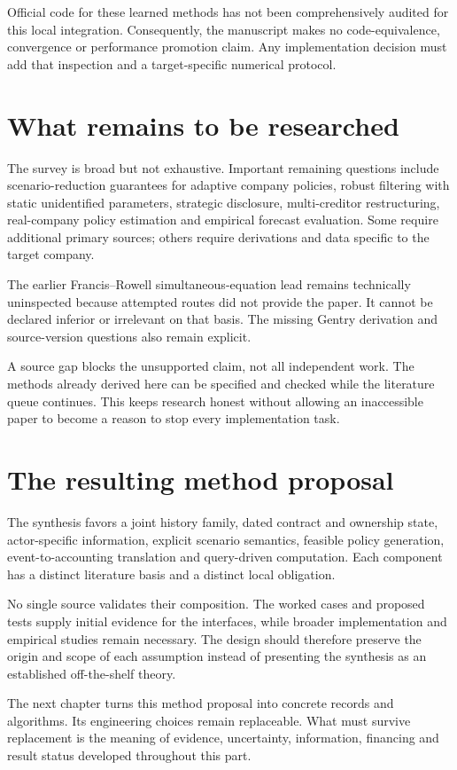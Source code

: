 Official code for these learned methods has not been comprehensively audited for this local integration. Consequently, the manuscript makes no code-equivalence, convergence or performance promotion claim. Any implementation decision must add that inspection and a target-specific numerical protocol.

\section{What remains to be researched}
The survey is broad but not exhaustive. Important remaining questions include scenario-reduction guarantees for adaptive company policies, robust filtering with static unidentified parameters, strategic disclosure, multi-creditor restructuring, real-company policy estimation and empirical forecast evaluation. Some require additional primary sources; others require derivations and data specific to the target company.

The earlier Francis--Rowell simultaneous-equation lead remains technically uninspected because attempted routes did not provide the paper. It cannot be declared inferior or irrelevant on that basis. The missing Gentry derivation and source-version questions also remain explicit.

A source gap blocks the unsupported claim, not all independent work. The methods already derived here can be specified and checked while the literature queue continues. This keeps research honest without allowing an inaccessible paper to become a reason to stop every implementation task.

\section{The resulting method proposal}
The synthesis favors a joint history family, dated contract and ownership state, actor-specific information, explicit scenario semantics, feasible policy generation, event-to-accounting translation and query-driven computation. Each component has a distinct literature basis and a distinct local obligation.

No single source validates their composition. The worked cases and proposed tests supply initial evidence for the interfaces, while broader implementation and empirical studies remain necessary. The design should therefore preserve the origin and scope of each assumption instead of presenting the synthesis as an established off-the-shelf theory.

The next chapter turns this method proposal into concrete records and algorithms. Its engineering choices remain replaceable. What must survive replacement is the meaning of evidence, uncertainty, information, financing and result status developed throughout this part.
